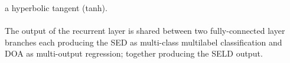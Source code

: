 \documentclass{article}
\begin{document}
    a hyperbolic tangent (tanh).
    \\ \\ The output of the recurrent layer is shared between two fully-connected layer branches each producing the SED as 
    multi-class multilabel classification and DOA as multi-output regression; together producing the SELD output.
    \begin{figure}[htb!]
        \centering
        \label{fig:dqnn}
    \end{figure}
    \\ \\ \\
\end{document}
